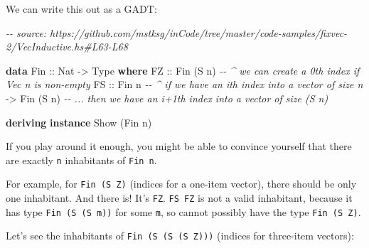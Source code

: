 \documentclass[]{article}
\newenvironment{Shaded}{}{}
\newcommand{\CommentTok}[1]{\textcolor[rgb]{0.38,0.63,0.69}{\textit{#1}}}
\newcommand{\DataTypeTok}[1]{\textcolor[rgb]{0.56,0.13,0.00}{#1}}
\newcommand{\KeywordTok}[1]{\textcolor[rgb]{0.00,0.44,0.13}{\textbf{#1}}}
\newcommand{\NormalTok}[1]{#1}
\newcommand{\OtherTok}[1]{\textcolor[rgb]{0.00,0.44,0.13}{#1}}
\begin{document}
We can write this out as a GADT:

\begin{Shaded}
\begin{Highlighting}[]
\CommentTok{{-}{-} source: https://github.com/mstksg/inCode/tree/master/code{-}samples/fixvec{-}2/VecInductive.hs\#L63{-}L68}

\KeywordTok{data} \DataTypeTok{Fin}\OtherTok{ ::} \DataTypeTok{Nat} \OtherTok{{-}>} \DataTypeTok{Type} \KeywordTok{where}
    \DataTypeTok{FZ}\OtherTok{ ::} \DataTypeTok{Fin}\NormalTok{ (}\DataTypeTok{\textquotesingle{}S}\NormalTok{ n)  }\CommentTok{{-}{-} \^{} we can create a 0th index if Vec n is non{-}empty}
    \DataTypeTok{FS}\OtherTok{ ::} \DataTypeTok{Fin}\NormalTok{ n       }\CommentTok{{-}{-} \^{} if we have an ith index into a vector of size n}
       \OtherTok{{-}>} \DataTypeTok{Fin}\NormalTok{ (}\DataTypeTok{\textquotesingle{}S}\NormalTok{ n)  }\CommentTok{{-}{-} ... then we have an i+1th index into a vector of size (\textquotesingle{}S n)}

\KeywordTok{deriving} \KeywordTok{instance} \DataTypeTok{Show}\NormalTok{ (}\DataTypeTok{Fin}\NormalTok{ n)}
\end{Highlighting}
\end{Shaded}

If you play around it enough, you might be able to convince yourself that there
are exactly \texttt{n} inhabitants of \texttt{Fin\ n}.

For example, for \texttt{Fin\ (\textquotesingle{}S\ \textquotesingle{}Z)}
(indices for a one-item vector), there should be only one inhabitant. And there
is! It's \texttt{FZ}. \texttt{FS\ FZ} is not a valid inhabitant, because it has
type \texttt{Fin\ (\textquotesingle{}S\ (\textquotesingle{}S\ m))} for some
\texttt{m}, so cannot possibly have the type
\texttt{Fin\ (\textquotesingle{}S\ \textquotesingle{}Z)}.

Let's see the inhabitants of
\texttt{Fin\ (\textquotesingle{}S\ (\textquotesingle{}S\ (\textquotesingle{}S\ \textquotesingle{}Z)))}
(indices for three-item vectors):
\end{document}

